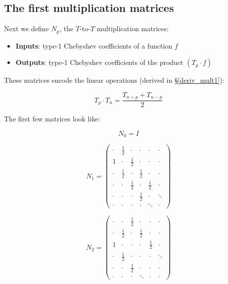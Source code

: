 \documentclass{article}
\begin{document}
\subsection{The first multiplication matrices}

Next we define $N_p$, the $T$-to-$T$ multiplication matrices:

\begin{itemize}
    \item \textbf{Inputs}: type-1 Chebyshev coefficients of a function $f$
    \item \textbf{Outputs}: type-1 Chebyshev coefficients of the product $(T_p \cdot f)$
\end{itemize}

These matrices encode the linear operations (derived in \S \ref{deriv_mult1}):

\begin{equation*}
T_p \cdot T_n = \frac{T_{n+p} + T_{n-p}}{2}
\end{equation*}

The first few matrices look like:

\begin{equation*}
N_0 = I
\end{equation*}

\begin{equation*}
\renewcommand*{\arraystretch}{1.2}
N_1 =
\begin{pmatrix}
\cdot & \frac{1}{2} & \cdot & \cdot & \cdot & \cdot \\
1 & \cdot & \frac{1}{2} & \cdot & \cdot & \cdot \\
\cdot & \frac{1}{2} & \cdot & \frac{1}{2} & \cdot & \cdot \\
\cdot & \cdot & \frac{1}{2} & \cdot & \frac{1}{2} & \cdot \\
\cdot & \cdot & \cdot & \frac{1}{2} & \cdot & \ddots \\
\cdot & \cdot & \cdot & \cdot & \ddots & \cdot
\end{pmatrix}
\end{equation*}

\begin{equation*}
\renewcommand*{\arraystretch}{1.2}
N_2 =
\begin{pmatrix}
\cdot & \cdot & \frac{1}{2} & \cdot & \cdot & \cdot \\
\cdot & \frac{1}{2} & \cdot & \frac{1}{2} & \cdot & \cdot \\
1 & \cdot & \cdot & \cdot & \frac{1}{2} & \cdot \\
\cdot & \frac{1}{2} & \cdot & \cdot & \cdot & \ddots \\
\cdot & \cdot & \frac{1}{2} & \cdot & \cdot & \cdot \\
\cdot & \cdot & \cdot & \ddots & \cdot & \cdot
\end{pmatrix}
\end{equation*}
\end{document}
